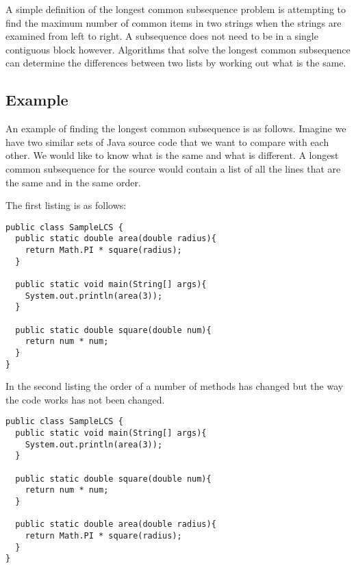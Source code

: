 A simple definition of the longest common subsequence problem is attempting to find the maximum number of common items in two strings when the strings are examined from left to right. A subsequence does not need to be in a single contiguous block however. Algorithms that solve the longest common subsequence can determine the differences between two lists by working out what is the same.   


\subsection{Example}
\label{sec:examplelcs}

An example of finding the longest common subsequence is as follows.
Imagine we have two similar sets of Java source code that we want to compare with each other.  
We would like to know what is the same and what is different.
A longest common subsequence for the source would contain a list of all the lines that are the same and in the same order.


\begin{minipage}[t]{1.0\textwidth}
The first listing is as follows:

\begin{lstlisting}
public class SampleLCS {
  public static double area(double radius){
    return Math.PI * square(radius);
  }
  
  public static void main(String[] args){
    System.out.println(area(3));
  }
 
  public static double square(double num){
    return num * num;
  }
}
\end{lstlisting}
\end{minipage}

\begin{minipage}[t]{1.0\textwidth}
In the second listing the order of a number of methods has changed but the way the code works has not been changed.

\begin{lstlisting}
public class SampleLCS {
  public static void main(String[] args){
    System.out.println(area(3));
  }
 
  public static double square(double num){
    return num * num;
  }
 
  public static double area(double radius){
    return Math.PI * square(radius);
  }
}
\end{lstlisting}
\end{minipage}

